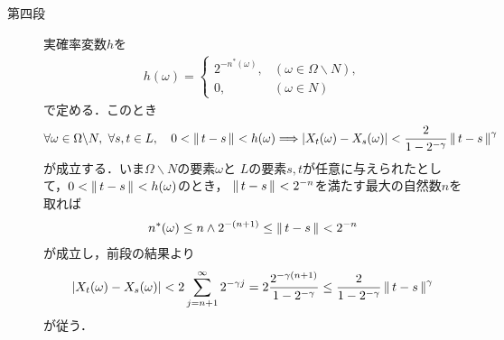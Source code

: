 \begin{prf}
\begin{description}
			\item[第四段]
				実確率変数$h$を
				\begin{align}
					h(\omega) =
					\begin{cases}
						2^{-n^*(\omega)}, & (\omega \in \Omega \backslash N), \\
						0, & (\omega \in N)
					\end{cases}
				\end{align}
				で定める．このとき
				\begin{align}
					\forall \omega \in \Omega \backslash N,\
					\forall s,t \in L,\quad
					0 < \left\|\, t-s\, \right\|_{} < h(\omega)
					\Longrightarrow |X_t(\omega)-X_s(\omega)| < \frac{2}{1-2^{-\gamma}}
					\left\|\, t-s\, \right\|_{}^\gamma
					\label{eq:chapter_2_theorem_2_8_3}
				\end{align}
				が成立する．いま$\Omega \backslash N$の要素$\omega$と
				$L$の要素$s,t$が任意に与えられたとして，$0 < \left\|\, t-s\, \right\|_{} < h(\omega)$のとき，
				$\left\|\, t-s\, \right\|_{} < 2^{-n}$を満たす最大の自然数$n$を取れば
				\begin{align}
					n^*(\omega) \leq n \wedge 2^{-(n+1)} \leq \left\|\, t-s\, \right\|_{} < 2^{-n}
				\end{align}
				が成立し，前段の結果より
				\begin{align}
					|X_t(\omega) - X_s(\omega)| < 2\sum_{j=n+1}^\infty 2^{-\gamma j}
					= 2 \frac{2^{-\gamma(n+1)}}{1-2^{-\gamma}}
					\leq \frac{2}{1-2^{-\gamma}} \left\|\, t-s\, \right\|_{}^\gamma
				\end{align}
				が従う．
				

\end{description}
\end{prf}
